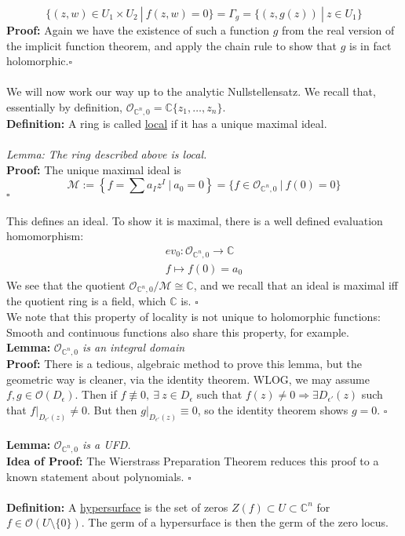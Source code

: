 \documentclass[12pt]{report}
\theoremstyle{definition}
\theoremstyle{remark}
\numberwithin{equation}{section}
\theoremstyle{definition}
\newcommand{\bb}[1]{\mathbb{#1}}
\newcommand{\mqed}{\hfill\newline\null \hfill$\square$\\ }
\begin{document}
$$
	\{(z,w) \in U_1 \times U_2\ |\ f(z,w) = 0 \} = \Gamma_g = \{(z,g(z))\ |\ z \in U_1\}
$$
\textbf{Proof: }Again we have the existence of such a function $g$ from the real version of the implicit function theorem, and apply the chain rule to show that $g$ is in fact holomorphic.\mqed\\
We will now work our way up to the analytic Nullstellensatz. We recall that, essentially by definition, $\mathcal{O}_{\bb C^n, 0} = \bb C\{z_1,\dots,z_n\}$. \\
\textbf{Definition: }A ring is called \underline{local} if it has a unique maximal ideal. \\\\
\textit{Lemma: The ring described above is local.}\\
\textbf{Proof: } The unique maximal ideal is 
$$
	\mathcal{M}:= \left\{f = \sum a_Iz^I\ |\ a_0 = 0\right\} = \{f \in \mathcal{O}_{\bb C^n,0}\ |\ f(0) =0 \}
$$
\mqed\\
This defines an ideal. To show it is maximal, there is a well defined evaluation homomorphism:
\begin{gather*}
	ev_0: \mathcal{O}_{\bb C^n,0} \to \bb C\\
f \mapsto f(0) = a_0
\end{gather*}
We see that the quotient $\mathcal{O}_{\bb C^n,0} / \mathcal{M} \cong \bb C$, and we recall that an ideal is maximal iff the quotient ring is a field, which $\bb C$ is. \mqed
We note that this property of locality is not unique to holomorphic functions: Smooth and continuous functions also share this property, for example. \\
\textbf{Lemma: }\textit{$\mathcal{O}_{\bb C^n,0}$ is an integral domain}\\
\textbf{Proof: }There is a tedious, algebraic method to prove this lemma, but the geometric way is cleaner, via the identity theorem. WLOG, we may assume $f,g \in \mathcal{O}(D_\epsilon)$. Then if $f \not \equiv 0,\ \exists\ z \in D_\epsilon$ such that $f(z) \ne 0 \Rightarrow \exists D_{\epsilon'}(z)$ such that $f|_{D_{\epsilon'}(z)	} \ne 0$. But then $g|_{D_{\epsilon'}(z)} \equiv 0$, so the identity theorem shows $g = 0$. \mqed\\
\textbf{Lemma: }\textit{$\mathcal{O}_{\bb C^n,0}$ is a UFD.}\\
\textbf{Idea of Proof: }The Wierstrass Preparation Theorem reduces this proof to a known statement about polynomials. \mqed\\
\textbf{Definition: }A \underline{hypersurface} is the set of zeros $Z(f) \subset U \subset \bb C^n$ for $f \in \mathcal{O}(U\setminus \{0\})$. The germ of a hypersurface is then the germ of the zero locus. \\\\
\end{document}

